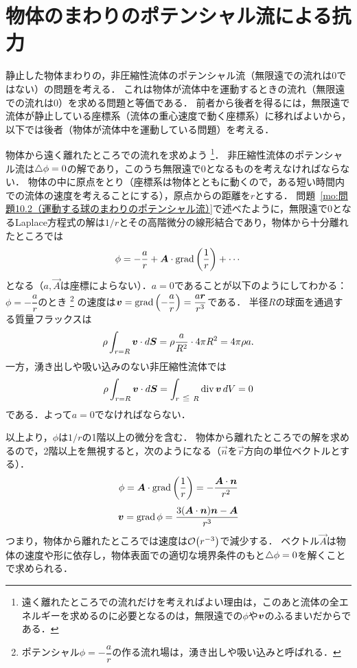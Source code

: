 \section{物体のまわりのポテンシャル流による抗力}

静止した物体まわりの，非圧縮性流体のポテンシャル流（無限遠での流れは0ではない）の問題を考える．
これは物体が流体中を運動するときの流れ（無限遠での流れは0）を求める問題と等価である．
前者から後者を得るには，無限遠で流体が静止している座標系（流体の重心速度で動く座標系）に移ればよいから，
以下では後者（物体が流体中を運動している問題）を考える．


物体から遠く離れたところでの流れを求めよう
\footnote{遠く離れたところでの流れだけを考えればよい理由は，このあと流体の全エネルギーを求めるのに必要となるのは，無限遠での$\phi$や$\vb*{v}$のふるまいだからである．}．
非圧縮性流体のポテンシャル流は$\triangle\phi=0$の解であり，このうち無限遠で0となるものを考えなければならない．
物体の中に原点をとり（座標系は物体とともに動くので，ある短い時間内での流体の速度を考えることにする），原点からの距離を$r$とする．
問題~\ref{mo:問題10.2（運動する球のまわりのポテンシャル流）}で述べたように，無限遠で0となるLaplace方程式の解は$1/r$とその高階微分の線形結合であり，物体から十分離れたところでは
\[
    \phi = -\frac{a}{r} + \vec{A} \cdot \Grad\pqty{\frac{1}{r}} + \cdots
\]
となる（$a,\vec{A}$は座標によらない）．$a=0$であることが以下のようにしてわかる：
$\phi=-\dfrac{a}{r}$のとき
\footnote{ポテンシャル$\phi=-\dfrac{a}{r}$の作る流れ場は，湧き出しや吸い込みと呼ばれる．}
の速度は$\v = \Grad\pqty{-\dfrac{a}{r}} = \dfrac{a\vec{r}}{r^3}$である．
半径$R$の球面を通過する質量フラックスは
\[
    \rho \int_{r=R} \vb*{v}\cdot d\vb*{S} = \rho \frac{a}{R^2} \cdot 4\pi R^2 = 4\pi\rho a .
\]
一方，湧き出しや吸い込みのない非圧縮性流体では
\[
    \rho \int_{r=R} \v\cdot\dS = \int_{r\ika R} \Div\v \dV = 0
\]
である．よって$a=0$でなければならない．


以上より，$\phi$は$1/r$の1階以上の微分を含む．
物体から離れたところでの解を求めるので，2階以上を無視すると，次のようになる（$\vec{n}$を$\vec{r}$方向の単位ベクトルとする）．
\begin{equation}\label{eq11.1:物体から離れたところでのポテンシャル流のポテンシャル}
    \phi = \vec{A} \cdot \Grad\pqty{\frac{1}{r}} = - \frac{\vec{A}\cdot\vec{n}}{r^2}
\end{equation}
\begin{equation}\label{eq11.2:物体から離れたところでのポテンシャル流の速度}
    \vb*{v} = \operatorname{grad}\phi = \frac{3(\vb*{A}\cdot\vb*{n})\vb*{n}-\vb*{A}}{r^3}
\end{equation}
つまり，物体から離れたところでは速度は$\order{r^{-3}}$で減少する．
ベクトル$\vec{A}$は物体の速度や形に依存し，物体表面での適切な境界条件のもと$\triangle\phi=0$を解くことで求められる．


